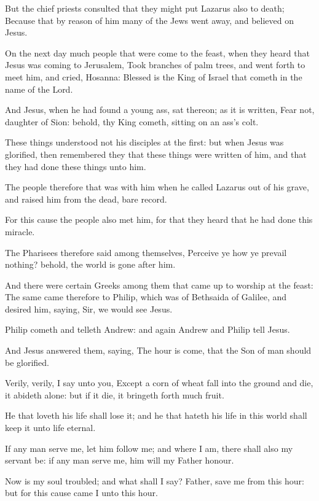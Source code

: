 \verse But the chief priests consulted that they might put Lazarus also to death; \verse Because that by reason of him many of the Jews went away, and believed on Jesus.

\verse On the next day much people that were come to the feast, when they heard that Jesus was coming to Jerusalem, \verse Took branches of palm trees, and went forth to meet him, and cried, Hosanna: Blessed is the King of Israel that cometh in the name of the Lord.

\verse And Jesus, when he had found a young ass, sat thereon; as it is written, \verse Fear not, daughter of Sion: behold, thy King cometh, sitting on an ass's colt.

\verse These things understood not his disciples at the first: but when Jesus was glorified, then remembered they that these things were written of him, and that they had done these things unto him.

\verse The people therefore that was with him when he called Lazarus out of his grave, and raised him from the dead, bare record.

\verse For this cause the people also met him, for that they heard that he had done this miracle.

\verse The Pharisees therefore said among themselves, Perceive ye how ye prevail nothing? behold, the world is gone after him.

\verse And there were certain Greeks among them that came up to worship at the feast: \verse The same came therefore to Philip, which was of Bethsaida of Galilee, and desired him, saying, Sir, we would see Jesus.

\verse Philip cometh and telleth Andrew: and again Andrew and Philip tell Jesus.

\verse And Jesus answered them, saying, The hour is come, that the Son of man should be glorified.

\verse Verily, verily, I say unto you, Except a corn of wheat fall into the ground and die, it abideth alone: but if it die, it bringeth forth much fruit.

\verse He that loveth his life shall lose it; and he that hateth his life in this world shall keep it unto life eternal.

\verse If any man serve me, let him follow me; and where I am, there shall also my servant be: if any man serve me, him will my Father honour.

\verse Now is my soul troubled; and what shall I say? Father, save me from this hour: but for this cause came I unto this hour.

